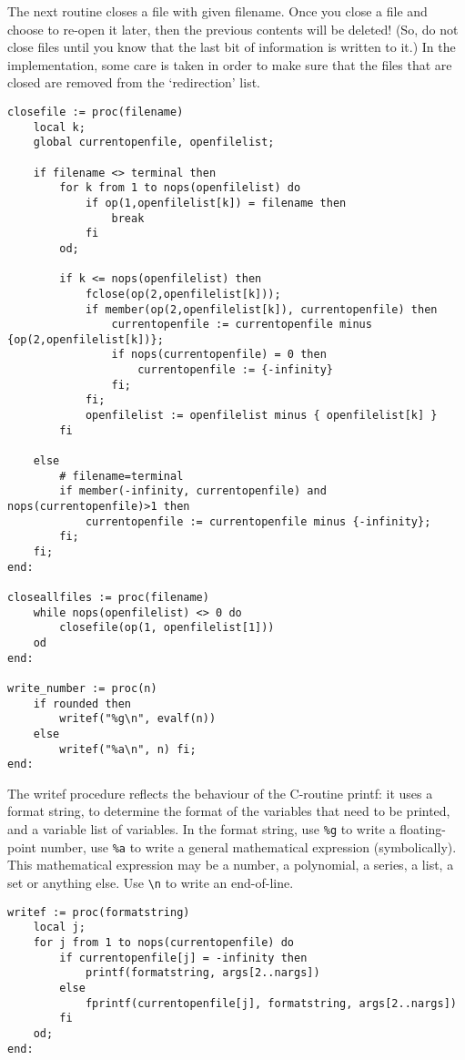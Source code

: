 \documentclass[a4paper,10pt]{article}
\begin{document}
The next routine closes a file with given filename.  Once you close a file and choose
to re-open it later, then the previous contents will be deleted! (So, do not close files
until you know that the last bit of information is written to it.)
In the implementation, some care is taken in order to make sure that the files that
are closed are removed from the `redirection' list.

\begin{lstlisting}[name=tools]
closefile := proc(filename)
    local k;
    global currentopenfile, openfilelist;

    if filename <> terminal then
        for k from 1 to nops(openfilelist) do
            if op(1,openfilelist[k]) = filename then
                break
            fi
        od;

        if k <= nops(openfilelist) then
            fclose(op(2,openfilelist[k]));
            if member(op(2,openfilelist[k]), currentopenfile) then
                currentopenfile := currentopenfile minus {op(2,openfilelist[k])};
                if nops(currentopenfile) = 0 then
                    currentopenfile := {-infinity}
                fi;
            fi;
            openfilelist := openfilelist minus { openfilelist[k] }
        fi

    else
        # filename=terminal
        if member(-infinity, currentopenfile) and nops(currentopenfile)>1 then
            currentopenfile := currentopenfile minus {-infinity};
        fi;
    fi;
end:

closeallfiles := proc(filename)
    while nops(openfilelist) <> 0 do
        closefile(op(1, openfilelist[1]))
    od
end:

write_number := proc(n)
    if rounded then
        writef("%g\n", evalf(n))
    else
        writef("%a\n", n) fi;
end:
\end{lstlisting}

The writef procedure reflects the behaviour of the C-routine printf:  it uses
a format string, to determine the format of the variables that need to be
printed, and a variable list of variables.  In the format string, use \verb+%g+ to write
a floating-point number, use \verb+%a+ to write a general mathematical expression (symbolically).
This mathematical expression may be a number, a polynomial, a series, a list, a set or anything else.
Use \verb+\n+ to write an end-of-line.

\begin{lstlisting}[name=tools]
writef := proc(formatstring)
    local j;
    for j from 1 to nops(currentopenfile) do
        if currentopenfile[j] = -infinity then
            printf(formatstring, args[2..nargs])
        else
            fprintf(currentopenfile[j], formatstring, args[2..nargs])
        fi
    od;
end:
\end{lstlisting}
\end{document}
